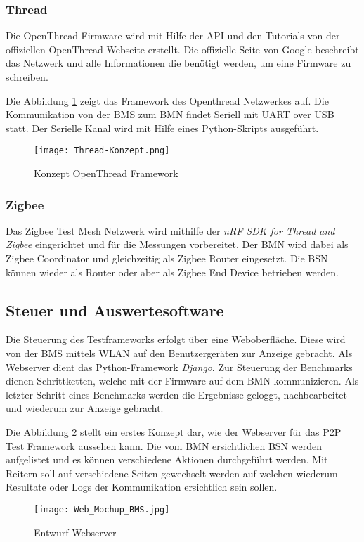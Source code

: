 \subsubsection{Thread}\label{subsubsection:Thread} 
Die OpenThread Firmware wird mit Hilfe der API und den Tutorials von der offiziellen OpenThread Webseite erstellt. Die offizielle Seite von Google beschreibt das Netzwerk und alle Informationen die benötigt werden, um eine Firmware zu schreiben.

Die Abbildung \ref{fig:ThreadKonzept} zeigt das Framework des Openthread Netzwerkes auf. Die Kommunikation von der BMS zum BMN findet Seriell mit UART over USB statt. Der Serielle Kanal wird mit Hilfe eines Python-Skripts ausgeführt. 
\begin{figure}[H]
	\centering
	\texttt{[image: Thread-Konzept.png]}
	\caption{Konzept OpenThread Framework}\label{fig:ThreadKonzept}
\end{figure}


\subsubsection{Zigbee}\label{subsubsection:Zigbee}
Das Zigbee Test Mesh Netzwerk wird mithilfe der \textit{nRF SDK for Thread and Zigbee} eingerichtet und für die Messungen vorbereitet. Der BMN wird dabei als Zigbee Coordinator und gleichzeitig als Zigbee Router eingesetzt. Die BSN können wieder als Router oder aber als Zigbee End Device betrieben werden.

\newpage
\subsection{Steuer und Auswertesoftware}\label{subsec:SteuerundAuswertesoftware}
Die Steuerung des Testframeworks erfolgt über eine Weboberfläche. Diese wird von der BMS mittels WLAN auf den Benutzergeräten zur Anzeige gebracht. Als Webserver dient das Python-Framework \textit{Django}. Zur Steuerung der Benchmarks dienen Schrittketten, welche mit der Firmware auf dem BMN kommunizieren. Als letzter Schritt eines Benchmarks werden die Ergebnisse geloggt, nachbearbeitet und wiederum zur Anzeige gebracht.

Die Abbildung \ref{fig:EntwurfWebserver} stellt ein erstes Konzept dar, wie der Webserver für das P2P Test Framework aussehen kann. Die vom BMN ersichtlichen BSN werden aufgelistet und es können verschiedene  Aktionen durchgeführt werden. Mit Reitern soll auf verschiedene Seiten gewechselt werden auf welchen wiederum Resultate oder Logs der Kommunikation ersichtlich sein sollen.

\begin{figure}[H]
	\centering
	\texttt{[image: Web\_Mochup\_BMS.jpg]}
	\caption{Entwurf Webserver}\label{fig:EntwurfWebserver}
\end{figure}

